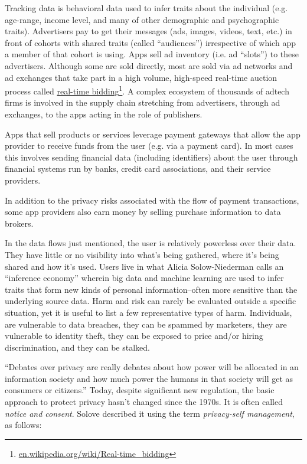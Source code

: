 \documentclass[11pt, oneside]{article}   	%
\newcommand{\hyperfootnote}[1][]{\def\ArgI{{#1}}\hyperfootnoteRelay}
\newcommand\hyperfootnoteRelay[2][]{\href{#1#2}{\ArgI}\footnote{\href{#1#2}{#2}}}
\begin{document}
Tracking data is behavioral data used to infer traits about the individual (e.g. age-range, income level, and many of other demographic and psychographic traits). Advertisers pay to get their messages (ads, images, videos, text, etc.) in front of cohorts with shared traits (called ``audiences'') irrespective of which app a member of that cohort is using. Apps sell ad inventory (i.e. ad ``slots'') to these advertisers. Although some are sold directly, most are sold via ad networks and ad exchanges that take part in a high volume, high-speed real-time auction process called \hyperfootnote[real-time bidding][https://]{en.wikipedia.org/wiki/Real-time\_bidding}. A complex ecosystem of thousands of adtech firms is involved in the supply chain stretching from advertisers, through ad exchanges, to the apps acting in the role of publishers. 

Apps that sell products or services leverage payment gateways that allow the app provider to receive funds from the user (e.g. via a payment card). In most cases this involves sending financial data (including identifiers) about the user through financial systems run by banks, credit card associations, and their service providers.

In addition to the privacy risks associated with the flow of payment transactions, some app providers also earn money by selling purchase information to data brokers.

In the data flows just mentioned, the user is relatively powerless over their data. They have little or no visibility into what's being gathered, where it's being shared and how it's used. Users live in what Alicia Solow-Niederman calls an ``inference economy''\cite{Solow-Niederman2022} wherein big data and machine learning are used to infer traits that form new kinds of personal information--often more sensitive than the underlying source data. Harm and risk can rarely be evaluated outside a specific situation\cite{Solove2023}, yet it is useful to list a few representative types of harm. Individuals, are vulnerable to data breaches, they can be spammed by marketers, they are vulnerable to identity theft, they can be exposed to price and/or hiring discrimination, and they can be stalked. 

``Debates over privacy are really debates about how power will be allocated in an information society and how much power the humans in that society will get as consumers or citizens.''\cite{Richards2021} Today, despite significant new regulation, the basic approach to protect privacy hasn't changed since the 1970s. It is often called \emph{notice and consent}. Solove described it using the term \emph{privacy-self management}, as follows:
\end{document}
